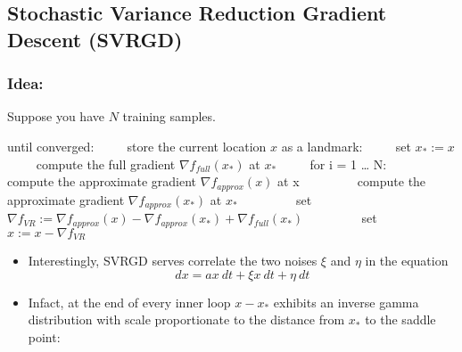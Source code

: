 \documentclass[11pt]{article}
\providecommand{\tightlist}{%
      \setlength{\itemsep}{0pt}\setlength{\parskip}{0pt}}
\begin{document}
    \hypertarget{stochastic-variance-reduction-gradient-descent-svrgd}{%
\subsection{Stochastic Variance Reduction Gradient Descent
(SVRGD)}\label{stochastic-variance-reduction-gradient-descent-svrgd}}

\hypertarget{idea}{%
\subsubsection{Idea:}\label{idea}}

Suppose you have \(N\) training samples.

until converged: \(\quad\quad\) store the current location \(x\) as a
landmark: \(\quad\quad\) set \(x_{*} := x\) \(\quad\quad\) compute the
full gradient \(\nabla f_{full}(x_*)\) at \(x_*\) \(\quad\quad\) for i =
1 \ldots{} N: \(\quad\quad\quad\quad\) compute the approximate gradient
\(\nabla f_{approx}(x)\) at x \(\quad\quad\quad\quad\) compute the
approximate gradient \(\nabla f_{approx}(x_*)\) at \(x_*\)
\(\quad\quad\quad\quad\) set
\(\nabla f_{VR} := \nabla f_{approx}(x)-\nabla f_{approx}(x_*)+\nabla f_{full}(x_*)\)
\(\quad\quad\quad\quad\) set \(x := x - \nabla f_{VR}\)

    \begin{itemize}
\tightlist
\item
  Interestingly, SVRGD serves correlate the two noises \(\xi\) and
  \(\eta\) in the equation \[dx = ax \:dt+\xi x \:dt +\eta\: dt\]
\item
  Infact, at the end of every inner loop \(x-x_*\) exhibits an inverse
  gamma distribution with scale proportionate to the distance from
  \(x_*\) to the saddle point:
\end{itemize}
\end{document}
